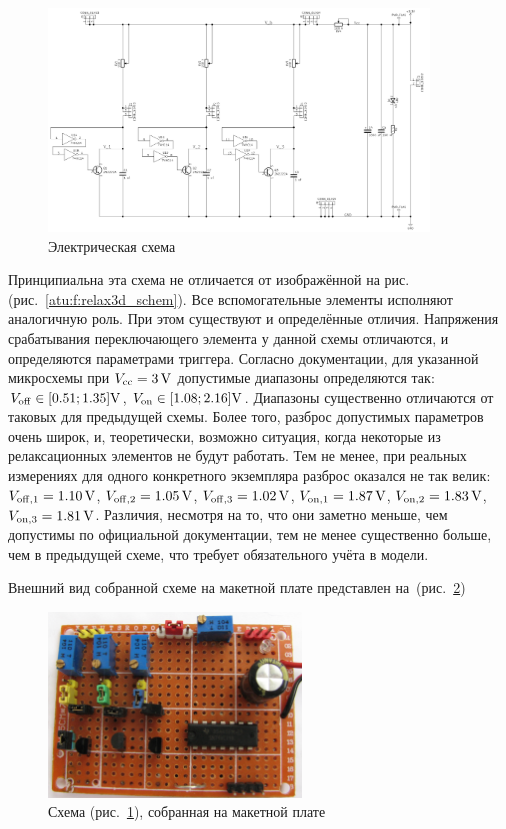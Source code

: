 \begin{figure}[htb!]
  \centerline{\includegraphics[width=0.9\textwidth]{p/relax3ds_schem.png} }
  \caption{Электрическая схема \RelaxShIi}
  \label{atu:f:relax3ds_schem}
\end{figure}

Принципиальна эта схема не отличается от изображённой на рис.(рис.~\ref{atu:f:relax3d_schem}).
Все вспомогательные элементы исполняют аналогичную роль.
При этом существуют и определённые отличия.
Напряжения срабатывания переключающего элемента
у данной схемы отличаются, и определяются
параметрами триггера.
Согласно документации, для указанной микросхемы
при $V_\mathrm{cc} = \SI{3}{\volt} $
допустимые диапазоны определяются так:
$V_\mathrm{off} \in [ 0.51; 1.35 ] \SI{}{\volt}$,
$V_\mathrm{on}  \in [ 1.08; 2.16 ] \SI{}{\volt}$.
Диапазоны существенно отличаются от таковых для предыдущей схемы.
Более того, разброс допустимых параметров очень широк,
и, теоретически, возможно ситуация, когда некоторые из релаксационных
элементов не будут работать.
Тем не менее, при реальных измерениях
для одного конкретного экземпляра
разброс оказался не так велик:
$V_\mathrm{off,1} = \SI{1.10}{\volt}$,
$V_\mathrm{off,2} = \SI{1.05}{\volt}$,
$V_\mathrm{off,3} = \SI{1.02}{\volt}$,
$V_\mathrm{on,1}  = \SI{1.87}{\volt}$,
$V_\mathrm{on,2}  = \SI{1.83}{\volt}$,
$V_\mathrm{on,3}  = \SI{1.81}{\volt}$.
Различия, несмотря на то, что они заметно меньше, чем допустимы по официальной документации,
тем не менее существенно больше, чем в предыдущей схеме, что требует
обязательного учёта в модели.

Внешний вид собранной схеме на макетной плате представлен на~(рис.~\ref{atu:f:relax3ds_board})

\begin{figure}[htb!]
  \centerline{\includegraphics[width=0.6\textwidth]{p/relax3ds_board.jpg} }
  \caption{Схема (рис.~\ref{atu:f:relax3ds_schem}), собранная на макетной плате}
  \label{atu:f:relax3ds_board}
\end{figure}

